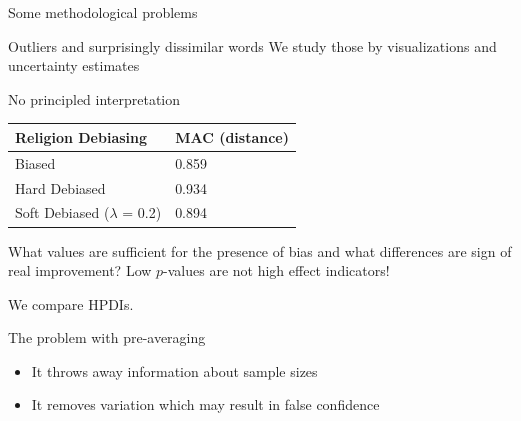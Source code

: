 \documentclass[
  10pt,
  ignorenonframetext,
  x11names, dvipsnames, bibspacing,natbib]{beamer}
\providecommand{\tightlist}{%
  \setlength{\itemsep}{0pt}\setlength{\parskip}{0pt}}
\begin{document}
\begin{frame}{Some methodological problems}
\protect\hypertarget{some-methodological-problems-2}{}
\begin{block}{Outliers and surprisingly dissimilar words}
\protect\hypertarget{outliers-and-surprisingly-dissimilar-words}{}
We study those by visualizations and uncertainty estimates

\pause
\end{block}

\begin{block}{No principled interpretation}
\protect\hypertarget{no-principled-interpretation}{}
\begin{longtable}[]{@{}ll@{}}
\toprule
Religion Debiasing & MAC (distance) \\
\midrule
\endhead
Biased & 0.859 \\
Hard Debiased & 0.934 \\
Soft Debiased (\(\lambda\) = 0.2) & 0.894 \\
\bottomrule
\end{longtable}

What values are sufficient for the presence of bias and what differences
are sign of real improvement? Low \(p\)-values are not high effect
indicators!

We compare HPDIs.
\end{block}
\end{frame}

\begin{frame}{The problem with pre-averaging}
\protect\hypertarget{the-problem-with-pre-averaging}{}
\begin{itemize}
\tightlist
\item
  It throws away information about sample sizes
\item
  It removes variation which may result in false confidence
\end{itemize}
\end{frame}
\end{document}
